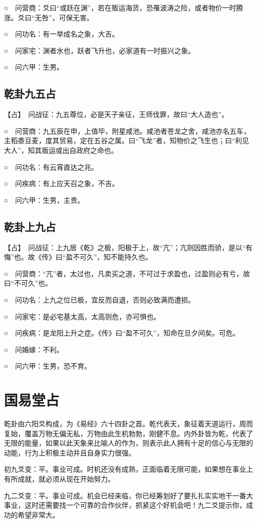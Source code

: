 \documentclass[12pt,oneside]{book}
\begin{document}
○　问营商：爻曰“或跃在渊”，若在贩运海货，恐罹波涛之险，或者物价一时腾涨。爻曰“无咎”，可保无害。

○　问功名：有一举成名之象，大吉。

○　问家宅：渊者水也，跃者飞升也，必家道有一时振兴之象。

○　问六甲：生男。

\subsection{乾卦九五占}
【占】　问战征：九五尊位，必是天子亲征，王师伐罪，故曰“大人造也”。

○　问营商：九五辰在申，上值毕，附星咸池。咸池者苍龙之舍，咸池亦名五车，主稻黍豆麦，度其贸易，定在五谷之属。曰“飞龙”者，知物价之飞生也；曰“利见大人”，知其贩运或出自政府之命也。

○　问功名：有云宵直达之兆。

○　问疾病：有上应天召之象，不吉。

○　问六甲：生男，主贵。

\subsection{乾卦上九占}
【占】　问战征：上九居《乾》之极，阳极于上，故“亢”；亢则因胜而骄，是以“有悔”也。故《传》曰“盈不可久”，知不能持久也。

○　问营商：“亢”者，太过也，凡卖买之道，不可过于求盈也，过盈则必有亏，故曰“不可久”也。

○　问功名：上九之位已极，宜反而自退，否则必致满而遭损。

○　问家宅：是必宅基太高，太高则危，亦可惧也。

○　问疾病：是龙阳上升之症。《传》曰“盈不可久”，知命在旦夕间矣。可危。

○　问婚嫁：不利。

○　问六甲：生男，恐不育。


\section{国易堂占}
乾卦由六阳爻构成，为《易经》六十四卦之首。乾代表天，象征着天道运行，周而复始，覆盖万物无偏无私，万物由此生机勃勃，刚健不息。内外卦皆为乾，代表了无限的能量，如果以此天象来比喻人的作为，则表示此人拥有十足的信心与无限的动能，行为上积极主动并且自身实力很强。

初九爻变：平。事业可成。时机还没有成熟，正面临着无限可能，如果想在事业上有所成就，就必须从现在开始努力。

九二爻变：平。事业可成。机会已经来临，你已经筹划好了要扎扎实实地干一番大事业，这时还需要找一个可靠的合作伙伴，抓紧这个好机会吧！九二爻提示你，成功的希望非常大。
\end{document}
